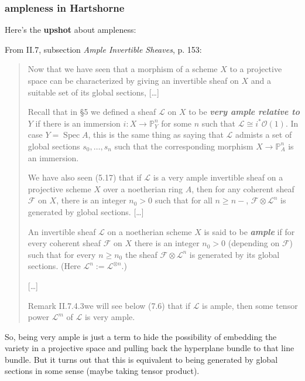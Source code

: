 \subsubsection*{ampleness in Hartshorne}

Here's the \textbf{upshot} about ampleness:

From II.7, subsection \textit{Ample Invertible Sheaves}, p. 153:
\begin{quotation}
	Now that we have seen that a morphism of a scheme \(X\) to a projective space can be characterized by giving an invertible sheaf on \(X\) and a suitable set of its global sections, […]

	Recall that in §5 we defined a sheaf \(\mathcal{L}\) on \(X\) to be \textit{\textbf{very ample relative to \(Y\)}} if there is an immersion \(i: X \to \mathbb{P}^n_Y\) for some \(n\) such that \(\mathcal{L} \cong i^*\mathcal{O}(1)\). In case \(Y = \operatorname{Spec}A\), this is the same thing as saying that \(\mathcal{L}\) admists a set of global sections \(s_0,\ldots,s_n\) such that the corresponding morphism \(X \to \mathbb{P}^n_A\) is an immersion.

	We have also seen (5.17) that if \(\mathcal{L}\) is a very ample invertible sheaf on a projective scheme \(X\) over a noetherian ring \(A\), then for any coherent sheaf \(\mathcal{F}\) on \(X\), there is an integer \(n_0>0\) such that for all \(n \geq  n-\), \(\mathcal{F} \otimes \mathcal{L}^n\) is generated by global sections. […]
	\begin{defn}\leavevmode
	An invertible sheaf \(\mathcal{L}\) on a noetherian scheme \(X\) is said to be \textit{\textbf{ample}} if for every coherent sheaf  \(\mathcal{F}\) on \(X\) there is an integer \(n_0>0\) (depending on \(\mathcal{F}\)) such that for every \(n \geq  n_0\) the sheaf \(\mathcal{F} \otimes \mathcal{L}^n\) is generated by its global sections. (Here \(\mathcal{L}^n:= \mathcal{L}^{\otimes n}\).)
	\end{defn}
	[…]
	\begin{thing5}{Remark II.7.4.3}\label{rk:II.7.4.3}\leavevmode
		[…] we will see below (7.6) that if \(\mathcal{L}\) is ample, then some tensor power  \(\mathcal{L}^m\) of \(\mathcal{L}\) is very ample.
	\end{thing5}
\end{quotation}

So, being very ample is just a term to hide the possibility of embedding the variety in a projective space and pulling back the hyperplane bundle to that line bundle. But it turns out that this is equivalent to being generated by global sections in some sense (maybe taking tensor product).

